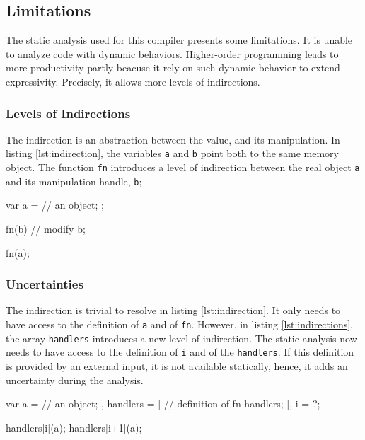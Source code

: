 \subsection{Limitations}

The static analysis used for this compiler presents some limitations.
It is unable to analyze code with dynamic behaviors.
Higher-order programming leads to more productivity partly beacuse it rely on such dynamic behavior to extend expressivity.
Precisely, it allows more levels of indirections.

\subsubsection{Levels of Indirections}

The indirection is an abstraction between the value, and its manipulation.
In listing \ref{lst:indirection}, the variables \texttt{a} and \texttt{b} point both to the same memory object.
The function \texttt{fn} introduces a level of indirection between the real object \texttt{a} and its manipulation handle, \texttt{b};

\begin{code}[js,
  caption={One level of Indirection},
  label={lst:indirection}]
var a = {
      // an object;
    };

fn(b) {
  // modify b;
}

fn(a);
\end{code}

\subsubsection{Uncertainties}

The indirection is trivial to resolve in listing \ref{lst:indirection}.
It only needs to have access to the definition of \texttt{a} and of \texttt{fn}.
However, in listing \ref{lst:indirections}, the array \texttt{handlers} introduces a new level of indirection.
The static analysis now needs to have access to the definition of \texttt{i} and of the \texttt{handlers}.
If this definition is provided by an external input, it is not available statically, hence, it adds an uncertainty during the analysis. 

\begin{code}[js,
  caption={Two levels of indirection},
  label={lst:indirections}]
var a = {
      // an object;
    },
    handlers = [
      // definition of fn handlers;
    ],
    i = ?;

handlers[i](a);
handlers[i+1](a);
\end{code}

